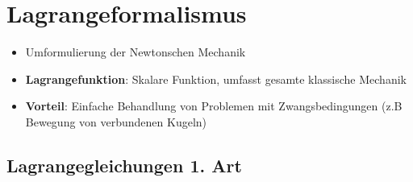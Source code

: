 \section{Lagrangeformalismus}%
\label{lag:sec:lagrangeformalismus}

\begin{itemize}
	\item Umformulierung der Newtonschen Mechanik
	\item \textbf{Lagrangefunktion}: Skalare Funktion, umfasst gesamte klassische Mechanik
	\item \textbf{Vorteil}: Einfache Behandlung von Problemen mit Zwangsbedingungen (z.B Bewegung von verbundenen Kugeln)
\end{itemize}

\subsection{Lagrangegleichungen 1. Art}%
\label{lag:sub:lagrangegleichungen_1_art}

